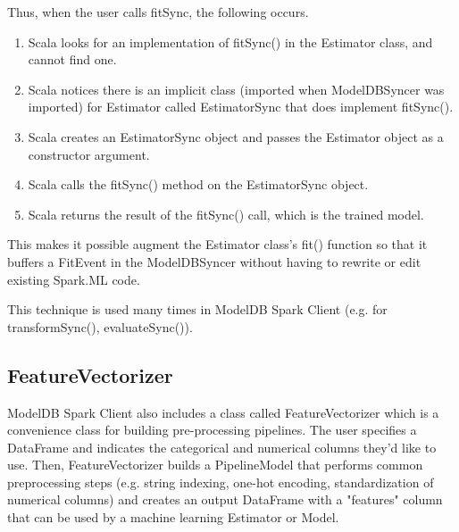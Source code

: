 Thus, when the user calls fitSync, the following occurs.

\begin{enumerate}
\item Scala looks for an implementation of fitSync() in the Estimator class, and cannot find one.
\item Scala notices there is an implicit class (imported when ModelDBSyncer was imported) 
for Estimator called EstimatorSync that does implement fitSync().
\item Scala creates an EstimatorSync object and passes the Estimator object as a constructor argument.
\item Scala calls the fitSync() method on the EstimatorSync object.
\item Scala returns the result of the fitSync() call, which is the trained model.
\end{enumerate}

This makes it possible augment the Estimator class's fit() function so that it 
buffers a FitEvent in the ModelDBSyncer without having to rewrite or edit existing Spark.ML code.

This technique is used many times in ModelDB Spark Client (e.g. for transformSync(), evaluateSync()).

\subsection{FeatureVectorizer}

ModelDB Spark Client also includes a class called FeatureVectorizer which is a convenience class
for building pre-processing pipelines. The user specifies a DataFrame and indicates the categorical and numerical columns
they'd like to use. Then, FeatureVectorizer builds a PipelineModel that performs common preprocessing steps (e.g. string indexing,
one-hot encoding, standardization of numerical columns) and creates an output DataFrame with a "features" column that can
be used by a machine learning Estimator or Model.

